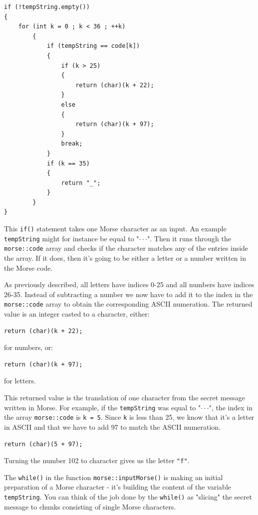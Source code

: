 \documentclass[12pt]{report}
\begin{document}
\begin{lstlisting}
if (!tempString.empty())
{
	for (int k = 0 ; k < 36 ; ++k)
		{
			if (tempString == code[k])
			{
				if (k > 25)
				{
					return (char)(k + 22);
				}
				else	
				{
					return (char)(k + 97);
				}
				break;
			}
			if (k == 35)	
			{
				return "_";
			}
		}
}
\end{lstlisting}

This \verb|if()| statement takes one Morse character as an input. An example \verb|tempString| might for instance be equal to "$\cdot\cdot$\text{-}$\cdot$". Then it runs through the \verb|morse::code| array and checks if the character matches any of the entries inside the array. If it does, then it's going to be either a letter or a number written in the Morse code.

As previously described, all letters have indices 0-25 and all numbers have indices 26-35. Instead of subtracting a number we now have to add it to the index in the \verb|morse::code| array to obtain the corresponding ASCII numeration. The returned value is an integer casted to a character, either:

\begin{lstlisting}
return (char)(k + 22);
\end{lstlisting}

for numbers, or:

\begin{lstlisting}
return (char)(k + 97);
\end{lstlisting}

for letters.

This returned value is the translation of one character from the secret message written in Morse. For example, if the \verb|tempString| was equal to "$\cdot\cdot$\text{-}$\cdot$", the index in the array \verb|morse::code| is \verb|k = 5|. Since \verb|k| is less than 25, we know that it's a letter in ASCII and that we have to add 97 to match the ASCII numeration. 

\newpage

\begin{lstlisting}
return (char)(5 + 97);
\end{lstlisting}

Turning the number 102 to character gives us the letter \verb|"f"|.

The \verb|while()| in the function  \verb|morse::inputMorse()| is making an initial preparation of a Morse character - it's building the content of the variable \verb|tempString|. You can think of the job done by the \verb|while()| as "slicing" the secret message to chunks consisting of single Morse characters.
\end{document}
